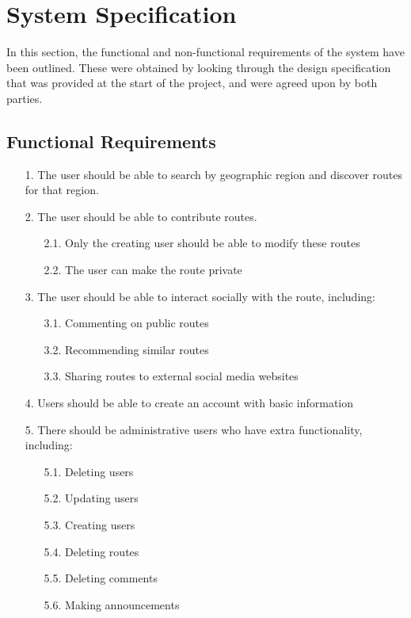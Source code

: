 \section{System Specification}
\label{sec:spec}
In this section, the functional and non-functional requirements of the system have been outlined. These were obtained by looking through the design specification that was provided at the start of the project, and were agreed upon by both parties. 

\subsection{Functional Requirements}
\label{sec:funcs}

 \begin{enumerate}
 \item[1.] The user should be able to search by geographic region and discover routes for that region.
 \item[2.] The user should be able to contribute routes.
 	\begin{enumerate}
 	\item[2.1.] Only the creating user should be able to modify these routes
 	\item[2.2.] The user can make the route private
 	\end{enumerate}
 \item[3.] The user should be able to interact socially with the route, including:
 	\begin{enumerate}
 	\item[3.1.] Commenting on public routes
 	\item[3.2.] Recommending similar routes
 	\item[3.3.] Sharing routes to external social media websites
 	\end{enumerate}
 \item[4.] Users should be able to create an account with basic information
 \item[5.] There should be administrative users who have extra functionality, including:
	 \begin{enumerate}
 		\item[5.1.] Deleting users
 		\item[5.2.] Updating users	
 		\item[5.3.] Creating users 		
 		\item[5.4.] Deleting routes
 		\item[5.5.] Deleting comments
 		\item[5.6.] Making announcements

\end{enumerate}
\end{enumerate}
